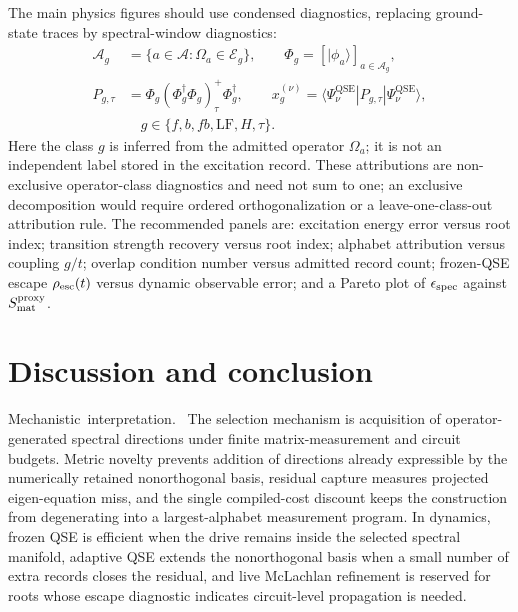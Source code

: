 \documentclass[
  reprint,
  amsmath,
  amssymb,
  aps,
  pra,
  nofootinbib,
  superscriptaddress,
  floatfix
]{revtex4-2}
\newcommand{\tentative}[1]{\textcolor{red!70!black}{#1}}
\newcommand{\structlabel}[1]{\noindent\mbox{\tentative{#1.}}~}
\newcommand{\Ecal}{\mathcal{E}}
\newcommand{\Acal}{\mathcal{A}}
\newcommand{\qse}{\mathrm{QSE}}
\newcommand{\lf}{\mathrm{LF}}
\newcommand{\ket}[1]{|#1\rangle}
\newcommand{\bra}[1]{\langle #1|}
\begin{document}
The main physics figures should use condensed diagnostics, replacing ground-state traces by spectral-window diagnostics:
\begin{equation}
\begin{aligned}
\Acal_g&=\{a\in\Acal:\Omega_a\in\Ecal_g\},
\qquad
\Phi_g=[\ket{\phi_a}]_{a\in\Acal_g},\\
P_{g,\tau}
&=
\Phi_g(\Phi_g^\dagger\Phi_g)_\tau^+\Phi_g^\dagger,
\qquad
x_g^{(\nu)}
=
\bra{\Psi_\nu^{\qse}}P_{g,\tau}\ket{\Psi_\nu^{\qse}},\\
&\hspace{1em}g\in\{f,b,fb,\lf,H,\tau\}.
\end{aligned}
\label{eq:alphabet_attribution}
\end{equation}
Here the class \(g\) is inferred from the admitted operator \(\Omega_a\); it is not an independent label stored in the excitation record.  These attributions are non-exclusive operator-class diagnostics and need not sum to one; an exclusive decomposition would require ordered orthogonalization or a leave-one-class-out attribution rule.
The recommended panels are: excitation energy error versus root index; transition strength recovery versus root index; alphabet attribution versus coupling $g/t$; overlap condition number versus admitted record count; frozen-QSE escape $\rho_{\rm esc}(t)$ versus dynamic observable error; and a Pareto plot of $\epsilon_{\rm spec}$ against $S_{\rm mat}^{\rm proxy}$.

\section{Discussion and conclusion}
\label{sec:discussion}
\label{sec:conclusion}

\structlabel{Mechanistic interpretation}
The selection mechanism is acquisition of operator-generated spectral directions under finite matrix-measurement and circuit budgets.  Metric novelty prevents addition of directions already expressible by the numerically retained nonorthogonal basis, residual capture measures projected eigen-equation miss, and the single compiled-cost discount keeps the construction from degenerating into a largest-alphabet measurement program.  In dynamics, frozen QSE is efficient when the drive remains inside the selected spectral manifold, adaptive QSE extends the nonorthogonal basis when a small number of extra records closes the residual, and live McLachlan refinement is reserved for roots whose escape diagnostic indicates circuit-level propagation is needed.
\end{document}

